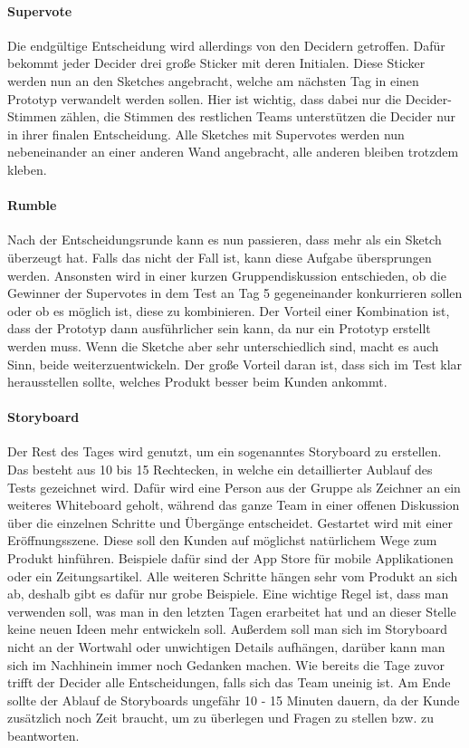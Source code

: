 \paragraph{Supervote}
Die endgültige Entscheidung wird allerdings von den Decidern getroffen. Dafür bekommt jeder Decider drei große Sticker mit deren Initialen. Diese Sticker werden nun an den Sketches angebracht, welche am nächsten Tag in einen Prototyp verwandelt werden sollen. Hier ist wichtig, dass dabei nur die Decider-Stimmen zählen, die Stimmen des restlichen Teams unterstützen die Decider nur in ihrer finalen Entscheidung. Alle Sketches mit Supervotes werden nun nebeneinander an einer anderen Wand angebracht, alle anderen bleiben trotzdem kleben.

\paragraph{Rumble}
Nach der Entscheidungsrunde kann es nun passieren, dass mehr als ein Sketch überzeugt hat. Falls das nicht der Fall ist, kann diese Aufgabe übersprungen werden. Ansonsten wird in einer kurzen Gruppendiskussion entschieden, ob die Gewinner der Supervotes in dem Test an Tag 5 gegeneinander konkurrieren sollen oder ob es möglich ist, diese zu kombinieren. Der Vorteil einer Kombination ist, dass der Prototyp dann ausführlicher sein kann, da nur ein Prototyp erstellt werden muss. Wenn die Sketche aber sehr unterschiedlich sind, macht es auch Sinn, beide weiterzuentwickeln. Der große Vorteil daran ist, dass sich im Test klar herausstellen sollte, welches Produkt besser beim Kunden ankommt. 

\paragraph{Storyboard}
Der Rest des Tages wird genutzt, um ein sogenanntes Storyboard zu erstellen. Das besteht aus 10 bis 15 Rechtecken, in welche ein detaillierter Aublauf des Tests gezeichnet wird. Dafür wird eine Person aus der Gruppe als Zeichner an ein weiteres Whiteboard geholt, während das ganze Team in einer offenen Diskussion über die einzelnen Schritte und Übergänge entscheidet. Gestartet wird mit einer Eröffnungsszene. Diese soll den Kunden auf möglichst natürlichem Wege zum Produkt hinführen. Beispiele dafür sind der App Store für mobile Applikationen oder ein Zeitungsartikel. Alle weiteren Schritte hängen sehr vom Produkt an sich ab, deshalb gibt es dafür nur grobe Beispiele. Eine wichtige Regel ist, dass man verwenden soll, was man in den letzten Tagen erarbeitet hat und an dieser Stelle keine neuen Ideen mehr entwickeln soll. Außerdem soll man sich im Storyboard nicht an der Wortwahl oder unwichtigen Details aufhängen, darüber kann man sich im Nachhinein immer noch Gedanken machen. Wie bereits die Tage zuvor trifft der Decider alle Entscheidungen, falls sich das Team uneinig ist. Am Ende sollte der Ablauf de Storyboards ungefähr 10 - 15 Minuten dauern, da der Kunde zusätzlich noch Zeit braucht, um zu überlegen und Fragen zu stellen bzw. zu beantworten.

